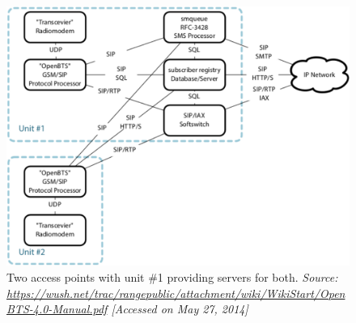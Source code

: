 \begin{figure}
  \centering
    \includegraphics[width=\textwidth]{btsLarge}
  \caption[OpenBTS network with two access points]{Two access points with unit 
  \#1 providing servers for both.
  \emph{Source: \url{https://wush.net/trac/rangepublic/attachment/wiki/WikiStart/OpenBTS-4.0-Manual.pdf} [Accessed on May 27, 2014]}
}
  \label{fig:btsLarge}
\end{figure}

